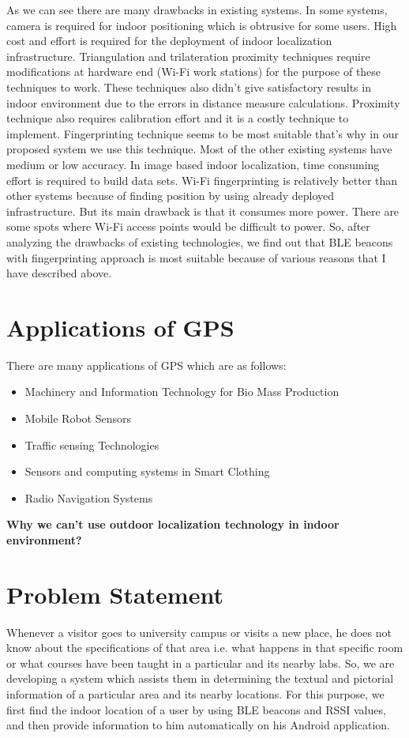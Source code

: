 As we can see there are many drawbacks in existing systems. In some systems, camera is required for indoor positioning which is obtrusive for some users. High cost and effort is required for the deployment of indoor localization infrastructure. Triangulation and trilateration proximity techniques require modifications at hardware end (Wi-Fi work stations) for the purpose of these techniques to work. These techniques also didn’t give satisfactory results in indoor environment due to the errors in distance measure calculations. Proximity technique also requires calibration effort and it is a costly technique to implement. Fingerprinting technique seems to be most suitable that’s why in our proposed system we use this technique. Most of the other existing systems have medium or low accuracy. In image based indoor localization, time consuming effort is required to build data sets. Wi-Fi fingerprinting is relatively better than other systems because of finding position by using already deployed infrastructure. But its main drawback is that it consumes more power. There are some spots where Wi-Fi access points would be difficult to power. So, after analyzing the drawbacks of existing technologies, we find out that BLE beacons with fingerprinting approach is most suitable because of various reasons that I have described above.

\section{Applications of GPS}
There are many applications of GPS which are as follows:
\begin{itemize}
\item Machinery and Information Technology for Bio Mass Production
\item Mobile Robot Sensors
\item Traffic sensing Technologies
\item Sensors and computing systems in Smart Clothing
\item Radio Navigation Systems
\end{itemize}
\textbf{Why we can’t use outdoor localization technology in indoor environment?}




\section{Problem Statement}
Whenever a visitor goes to university campus or visits a new place, he does not know about the specifications of that area i.e. what happens in that specific room or what courses have been taught in a particular and its nearby labs. So, we are developing a system which assists them in determining the textual and pictorial information of a particular area and its nearby locations. For this purpose, we first find the indoor location of a user by using BLE beacons and RSSI values, and then provide information to him automatically on his Android application. 